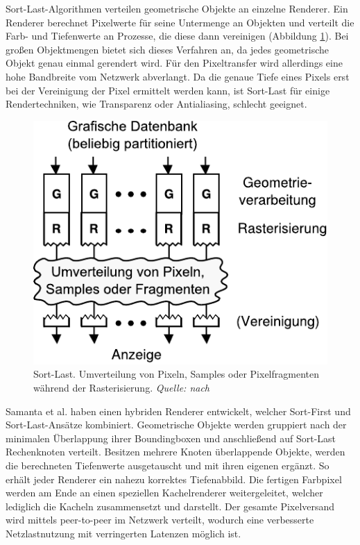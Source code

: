 Sort-Last-Algorithmen verteilen geometrische Objekte an einzelne Renderer. Ein Renderer berechnet Pixelwerte für seine Untermenge an Objekten und verteilt die Farb- und Tiefenwerte an Prozesse, die diese dann vereinigen (Abbildung \ref{fig:relwork:sortlast}). Bei großen Objektmengen bietet sich dieses Verfahren an, da jedes geometrische Objekt genau einmal gerendert wird. Für den Pixeltransfer wird allerdings eine hohe Bandbreite vom Netzwerk abverlangt. Da die genaue Tiefe eines Pixels erst bei der Vereinigung der Pixel ermittelt werden kann, ist Sort-Last für einige Rendertechniken, wie Transparenz oder Antialiasing, schlecht geeignet.
\begin{figure}
 \centering
  \includegraphics[scale=0.8]{images/sort-last.pdf}
  \caption{Sort-Last. Umverteilung von Pixeln, Samples oder Pixelfragmenten während der Rasterisierung. \textit{Quelle: nach \cite{molnar}}}
 \label{fig:relwork:sortlast}
\end{figure}
Samanta et al. \cite{samanta} haben einen hybriden Renderer entwickelt, welcher Sort-First und Sort-Last-Ansätze kombiniert. Geometrische Objekte werden gruppiert nach der minimalen Überlappung ihrer Boundingboxen und anschließend auf Sort-Last Rechenknoten verteilt. Besitzen mehrere Knoten überlappende Objekte, werden die berechneten Tiefenwerte ausgetauscht und mit ihren eigenen ergänzt. So erhält jeder Renderer ein nahezu korrektes Tiefenabbild. Die fertigen Farbpixel werden am Ende an einen speziellen Kachelrenderer weitergeleitet, welcher lediglich die Kacheln zusammensetzt und darstellt. Der gesamte Pixelversand wird mittels peer-to-peer im Netz\-werk verteilt, wodurch eine verbesserte Netzlastnutzung mit verringerten Latenzen möglich ist.\\
